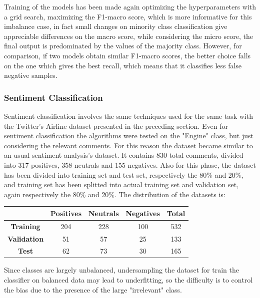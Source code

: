 Training of the models has been made again optimizing the hyperparameters with a grid search, maximizing the F1-macro score, which is more informative for this imbalance case, in fact small changes on minority class classification give appreciable differences on the macro score, while considering the micro score, the final output is predominated by the values of the majority class. However, for comparison, if two models obtain similar F1-macro scores, the better choice falls on the one which gives the best recall, which means that it classifies less false negative samples.



\subsubsection{Sentiment Classification}

Sentiment classification involves the same techniques used for the same task with the Twitter's Airline dataset presented in the preceding section. Even for sentiment classification the algorithms were tested on the "Engine" class, but just considering the relevant comments. For this reason the dataset became similar to an usual sentiment analysis's dataset. It contains 830 total comments, divided into 317 positives, 358 neutrals and 155 negatives. Also for this phase, the dataset has been divided into training set and test set, respectively the 80\% and 20\%, and training set has been splitted into actual training set and validation set, again respectively the 80\% and 20\%. The distribution of the datasets is:

\begin{center}
	\begin{tabular}{ | c  c  c c | c | } 
		\hline
		& \textbf{Positives} & \textbf{Neutrals} & \textbf{Negatives} & \textbf{Total} \\
		\hline
		\textbf{Training} & 204 & 228 & 100 & 532 \\ 
		\hline
		\textbf{Validation} & 51 & 57 & 25 & 133 \\ 
		\hline
		\textbf{Test} & 62 & 73 & 30 & 165 \\
		\hline
	\end{tabular}
\end{center}

Since classes are largely unbalanced, undersampling the dataset for train the classifier on balanced data may lead to underfitting, so the difficulty is to control the bias due to the presence of the large "irrelevant" class.



